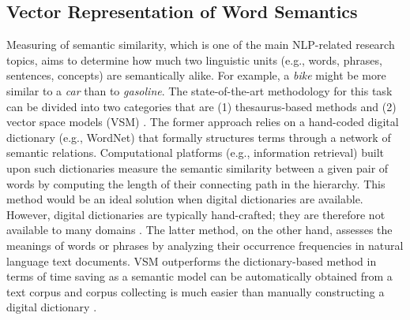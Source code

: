 \documentclass[Journal, BackFigs,NoLists, DoubleSpace]{ascelike}%
\begin{document}
\subsection{Vector Representation of Word Semantics}
%
Measuring of semantic similarity, which is one of the main NLP-related research topics, aims to determine how much two linguistic units (e.g., words, phrases, sentences, concepts) are semantically alike. For example, a \textit{bike} might be more similar to a \textit{car} than to \textit{gasoline}. The state-of-the-art methodology for this task can be divided into two categories that are (1) thesaurus-based methods and (2) vector space models (VSM) \cite{harispe13}. The former approach relies on a hand-coded digital dictionary (e.g., WordNet) that formally structures terms through a network of semantic relations. Computational platforms (e.g., information retrieval) built upon such dictionaries measure the semantic similarity between a given pair of words by computing the length of their connecting path in the hierarchy. This method would be an ideal solution when digital dictionaries are available. However, digital dictionaries are typically hand-crafted; they are therefore not available to many domains \cite{kolb08}. The latter method, on the other hand, assesses the meanings of words or phrases by analyzing their occurrence frequencies in natural language text documents. VSM outperforms the dictionary-based method in terms of time saving as a semantic model can be automatically obtained from a text corpus and corpus collecting is much easier than manually constructing a digital dictionary \cite{turney10}.
%
\par
\end{document}
